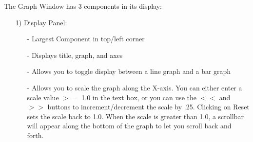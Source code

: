 \documentclass[10pt,dvips]{article}
\begin{document}
      The Graph Window has 3 components in its display:
   \begin{enumerate}
   \item[1)]
   Display Panel:
      \begin{itemize}
      \item[-]
        Largest Component in top/left corner
      \item[-]
        Displays title, graph, and axes
      \item[-]
        Allows you to toggle display between a line graph and a bar graph
      \item[-]
        Allows you to scale the graph along the X-axis.  You can either enter
        a scale value $>=$ 1.0 in the text box, or you can use the $<<$ and $>>$
        buttons to increment/decrement the scale by .25.  Clicking on Reset
        sets the scale back to 1.0.  When the scale is greater than 1.0, a
        scrollbar will appear along the bottom of the graph to let you
        scroll back and forth.
      \end{itemize}


\end{enumerate}
\end{document}
